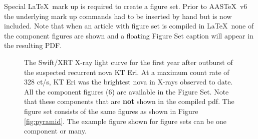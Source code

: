 \documentclass{aastex63}
\newcommand\aastex{AAS\TeX}
\newcommand\latex{La\TeX}
\begin{document}
Special \latex\ mark up is required to create a figure set.  Prior to
\aastex\ v6 the underlying mark up commands had to be inserted by hand
but is now included.  Note that when an article with figure set is compiled
in \latex\ none of the component figures are shown and a floating Figure
Set caption will appear in the resulting PDF.

\figsetstart
{}

\figsetgrpstart
{}
\figsetgrpend

\figsetgrpstart
{}
\figsetgrpend

\figsetgrpstart
{}
\figsetgrpend

\figsetgrpstart
{}
\figsetgrpend

\figsetgrpstart
{}
\figsetgrpend

\figsetgrpstart
{}
\figsetgrpend

\figsetend

\begin{figure}
\caption{The Swift/XRT X-ray light curve for the first year after
outburst of the suspected recurrent nova KT Eri. At a maximum count rate of 
328 ct/s, KT Eri was the brightest nova in X-rays observed to date. All 
the component figures (6) are available in the Figure Set. Note that
these components that are {\bf not} shown in the compiled pdf. The figure
set consists of the same figures as shown in Figure \ref{fig:pyramid}. 
The example figure shown for figure sets can be one component or many. 
\label{fig:fig4}}
\end{figure}
\end{document}
